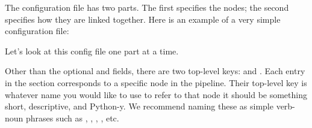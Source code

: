 \documentclass[letterpaper,10pt,english]{sphinxmanual}
\begin{document}
The configuration file has two parts. The first specifies the nodes; the second
specifies how they are linked together. Here is an example of a very simple
configuration file:

%
\begin{sphinxVerbatim}[commandchars=\\\{\}]
   
       

     
          
         
         

     
           
       

     
     
\end{sphinxVerbatim}

Let’s look at this config file one part at a time.

Other than the optional  and  fields,
there are two top-level keys:  and . Each entry in the
 section corresponds to a specific node in the pipeline. Their
top-level key is whatever name you would like to use to refer to that node \textendash{}
it should be something short, descriptive, and Python-y. We recommend naming
these as simple verb-noun phrases such as ,
, , , etc.
\end{document}
